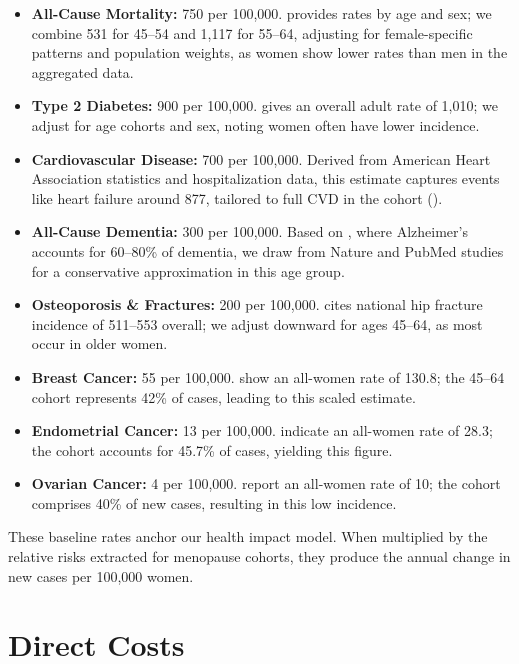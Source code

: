 \documentclass[12pt]{article}
\begin{document}
\begin{itemize}
\item \textbf{All-Cause Mortality:} 750 per 100,000. \cite{Xu2022} provides rates by age and sex; we combine 531 for 45--54 and 1,117 for 55--64, adjusting for female-specific patterns and population weights, as women show lower rates than men in the aggregated data.
\item \textbf{Type 2 Diabetes:} 900 per 100,000. \cite{CDC2023} gives an overall adult rate of 1,010; we adjust for age cohorts and sex, noting women often have lower incidence.
\item \textbf{Cardiovascular Disease:} 700 per 100,000. Derived from American Heart Association statistics and hospitalization data, this estimate captures events like heart failure around 877, tailored to full CVD in the cohort (\cite{Zhang2023}).
\item \textbf{All-Cause Dementia:} 300 per 100,000. Based on \cite{AlzAssociation2025}, where Alzheimer's accounts for 60--80\% of dementia, we draw from Nature and PubMed studies for a conservative approximation in this age group.
\item \textbf{Osteoporosis \& Fractures:} 200 per 100,000. \cite{IOF2025} cites national hip fracture incidence of 511--553 overall; we adjust downward for ages 45--64, as most occur in older women.
\item \textbf{Breast Cancer:} 55 per 100,000. \cite{SEERBreastCancer} show an all-women rate of 130.8; the 45--64 cohort represents 42\% of cases, leading to this scaled estimate.
\item \textbf{Endometrial Cancer:} 13 per 100,000. \cite{SEERProstateCancer} indicate an all-women rate of 28.3; the cohort accounts for 45.7\% of cases, yielding this figure.
\item \textbf{Ovarian Cancer:} 4 per 100,000. \cite{SEEROvaryCancer} report an all-women rate of 10; the cohort comprises 40\% of new cases, resulting in this low incidence.
\end{itemize}

These baseline rates anchor our health impact model. When multiplied by the relative risks extracted for menopause cohorts, they produce the annual change in new cases per 100,000 women.

\section*{Direct Costs}
\end{document}
